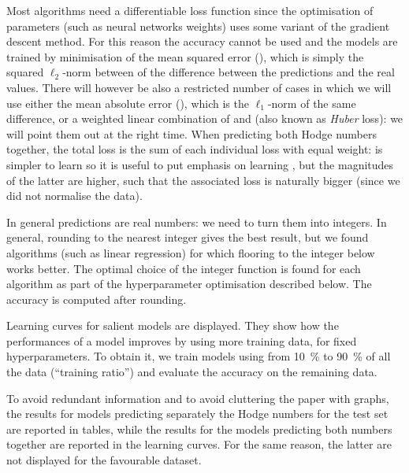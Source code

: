 Most algorithms need a differentiable loss function since the optimisation of parameters (such as neural networks weights) uses some variant of the gradient descent method.
For this reason the accuracy cannot be used and the models are trained by minimisation of the mean squared error (\mse), which is simply the squared $\ell_2$-norm between of the difference between the predictions and the real values.
There will however be also a restricted number of cases in which we will use either the mean absolute error (\mae), which is the $\ell_1$-norm of the same difference, or a weighted linear combination of \mse and \mae (also known as \textit{Huber} loss): we will point them out at the right time.
When predicting both Hodge numbers together, the total loss is the sum of each individual loss with equal weight:  is simpler to learn so it is useful to put emphasis on learning , but the magnitudes of the latter are higher, such that the associated loss is naturally bigger (since we did not normalise the data).

In general predictions are real numbers: we need to turn them into integers.
In general, rounding to the nearest integer gives the best result, but we found algorithms (such as linear regression) for which flooring to the integer below works better.
The optimal choice of the integer function is found for each algorithm as part of the hyperparameter optimisation described below.
The accuracy is computed after rounding.

Learning curves for salient models are displayed.
They show how the performances of a model improves by using more training data, for fixed hyperparameters.
To obtain it, we train models using from \SI{10}{\percent} to \SI{90}{\percent} of all the data (``training ratio'') and evaluate the accuracy on the remaining data.\footnotemark{}

To avoid redundant information and to avoid cluttering the paper with graphs, the results for models predicting separately the Hodge numbers for the test set are reported in tables, while the results for the models predicting both numbers together are reported in the learning curves.
For the same reason, the latter are not displayed for the favourable dataset.


